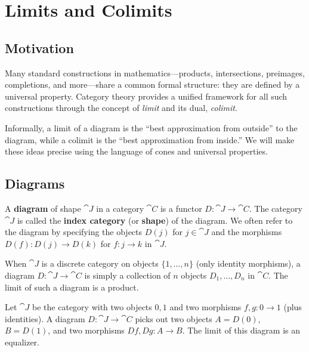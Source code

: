 \chapter{Limits and Colimits}
\label{ch:limits}

\section{Motivation}

Many standard constructions in mathematics—products, intersections, preimages, completions, and more—share a common formal structure: they are defined by a universal property. Category theory provides a unified framework for all such constructions through the concept of \emph{limit} and its dual, \emph{colimit}.

Informally, a limit of a diagram is the ``best approximation from outside'' to the diagram, while a colimit is the ``best approximation from inside.'' We will make these ideas precise using the language of cones and universal properties.

\section{Diagrams}

\begin{definition}[Diagram]
A \textbf{diagram} of shape $\cat{J}$ in a category $\cat{C}$ is a functor $D: \cat{J} \to \cat{C}$. The category $\cat{J}$ is called the \textbf{index category} (or \textbf{shape}) of the diagram. We often refer to the diagram by specifying the objects $D(j)$ for $j \in \cat{J}$ and the morphisms $D(f): D(j) \to D(k)$ for $f: j \to k$ in $\cat{J}$.
\end{definition}

\begin{example}
When $\cat{J}$ is a discrete category on objects $\{1, \ldots, n\}$ (only identity morphisms), a diagram $D: \cat{J} \to \cat{C}$ is simply a collection of $n$ objects $D_1, \ldots, D_n$ in $\cat{C}$. The limit of such a diagram is a product.
\end{example}

\begin{example}
Let $\cat{J}$ be the category with two objects $0, 1$ and two morphisms $f, g: 0 \to 1$ (plus identities). A diagram $D: \cat{J} \to \cat{C}$ picks out two objects $A = D(0)$, $B = D(1)$, and two morphisms $Df, Dg: A \to B$. The limit of this diagram is an equalizer.
\end{example}

